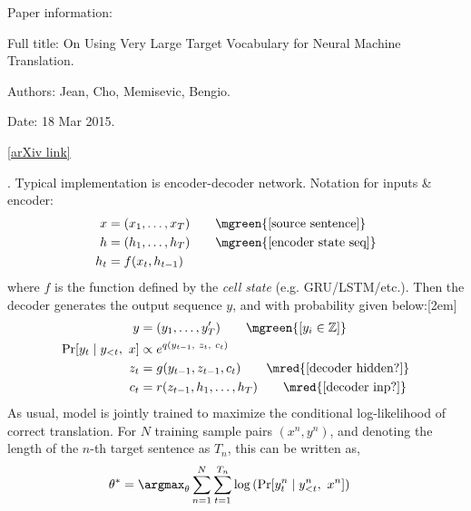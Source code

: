 \documentclass[11pt]{article}
\begin{document}
\p Paper information:
\begin{compactitem}[-]
	\item Full title: On Using Very Large Target Vocabulary for Neural Machine Translation. 
	\item Authors: Jean, Cho, Memisevic, Bengio.
	\item Date: 18 Mar 2015. 
	\item \href{https://arxiv.org/abs/1412.2007}{[arXiv link]}
\end{compactitem}


\myspace
\p {}. Typical implementation is encoder-decoder network. Notation for inputs \& encoder:
\begin{align}
x &= (x_1, \ldots, x_T)
\qquad \mgreen{\text{[source sentence]}} \\
h &= (h_1, \ldots, h_T)
\qquad \mgreen{\text{[encoder state seq]}} \\
h_t &= f(x_t, h_{t - 1}) \label{h}
\end{align}
where $f$ is the function defined by the \textit{cell state} (e.g. GRU/LSTM/etc.). Then the decoder generates the output sequence $y$, and with probability given below:[2em]
\begin{align}
y &= (y_1, \ldots, y_T') \qquad \mgreen{[y_i \in \mathbb{Z}]} \\
\Pr[y_t \mid y_{<t}, ~ x] &\propto e^{q(y_{t-1},~ z_t, ~ c_t)}  \label{y}\\
z_t &= g(y_{t - 1}, z_{t - 1}, c_t) 
\qquad \mred{\text{[decoder hidden?]}} \label{z} \\
c_t &= r(z_{t - 1}, h_1, \ldots, h_T) 
\qquad \mred{\text{[decoder inp?]}} \label{c}
\end{align}
As usual, model is jointly trained to maximize the conditional log-likelihood of correct translation. For $N$ training sample pairs $(x^n, y^n)$, and denoting the length of the $n$-th target sentence as $T_n$, this can be written as,
\begin{align}
\theta^* &= \argmax_\theta \sum_{n = 1}^{N} \sum_{t = 1}^{T_n}
\log\left(\Pr[y_t^n \mid y_{<t}^n, ~ x^n]  \right)
\end{align}
\end{document}
